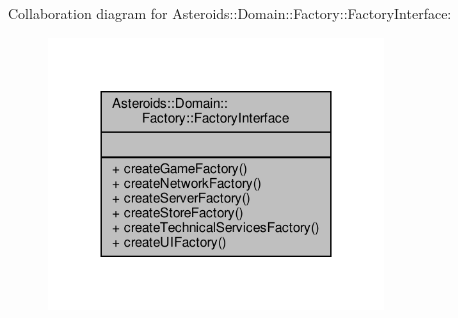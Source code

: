 Collaboration diagram for Asteroids\+:\+:Domain\+:\+:Factory\+:\+:Factory\+Interface\+:\nopagebreak
\begin{figure}[H]
\begin{center}
\leavevmode
\includegraphics[width=252pt]{classAsteroids_1_1Domain_1_1Factory_1_1FactoryInterface__coll__graph}
\end{center}
\end{figure}

